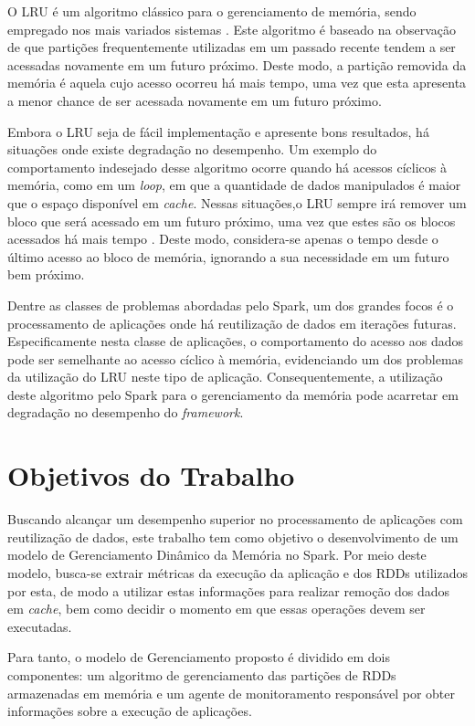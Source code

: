 O LRU é um algoritmo clássico para o gerenciamento de memória, sendo empregado nos mais variados sistemas \cite{robinson1990data}. Este algoritmo é baseado na observação de que partições frequentemente utilizadas em um passado recente tendem a ser acessadas novamente em um futuro próximo. Deste modo, a partição removida da memória é aquela cujo acesso ocorreu há mais tempo, uma vez que esta apresenta a menor chance de ser acessada novamente em um futuro próximo.

Embora o LRU seja de fácil implementação \cite{kim2000low} e apresente bons resultados, há situações onde existe degradação no desempenho. Um exemplo do comportamento indesejado desse algoritmo ocorre quando há acessos cíclicos à memória, como em um \textit{loop}, em que a quantidade de dados manipulados é maior que o espaço disponível em \textit{cache}. Nessas situações,o LRU sempre irá remover um bloco que será acessado em um futuro próximo, uma vez que estes são os blocos acessados há mais tempo \cite{jiang2002lirs}. Deste modo, considera-se apenas o tempo desde o último acesso ao bloco de memória, ignorando a sua necessidade em um futuro bem próximo.

Dentre as classes de problemas abordadas pelo Spark, um dos grandes focos é o processamento de aplicações onde há reutilização de dados em iterações futuras. Especificamente nesta classe de aplicações, o comportamento do acesso aos dados pode ser semelhante ao acesso cíclico à memória, evidenciando um dos problemas da utilização do LRU neste tipo de aplicação. Consequentemente, a utilização deste algoritmo pelo Spark para o gerenciamento da memória pode acarretar em degradação no desempenho do \textit{framework}.

\section{Objetivos do Trabalho}
Buscando alcançar um desempenho superior no processamento de aplicações com reutilização de dados, este trabalho tem como objetivo o desenvolvimento de um modelo de Gerenciamento Dinâmico da Memória no Spark. Por meio deste modelo, busca-se extrair métricas da execução da aplicação e dos RDDs utilizados por esta, de modo a utilizar estas informações para realizar remoção dos dados em \textit{cache}, bem como decidir o momento em que essas operações devem ser executadas.

Para tanto, o modelo de Gerenciamento proposto é dividido em dois componentes: um algoritmo de gerenciamento das partições de RDDs armazenadas em memória e um agente de monitoramento responsável por obter informações sobre a execução de aplicações.

